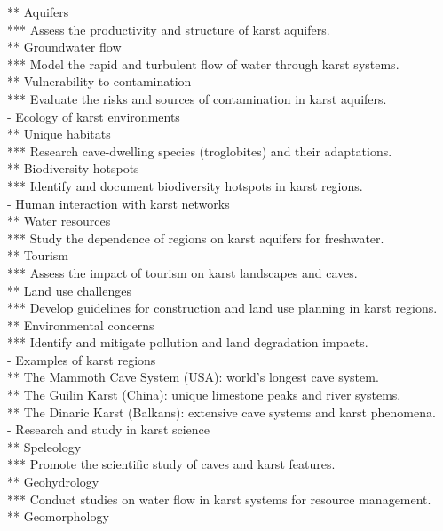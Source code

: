 ** Aquifers \\
*** Assess the productivity and structure of karst aquifers. \\
** Groundwater flow \\
*** Model the rapid and turbulent flow of water through karst systems. \\
** Vulnerability to contamination \\
*** Evaluate the risks and sources of contamination in karst aquifers. \\
- Ecology of karst environments \\
** Unique habitats \\
*** Research cave-dwelling species (troglobites) and their adaptations. \\
** Biodiversity hotspots \\
*** Identify and document biodiversity hotspots in karst regions. \\
- Human interaction with karst networks \\
** Water resources \\
*** Study the dependence of regions on karst aquifers for freshwater. \\
** Tourism \\
*** Assess the impact of tourism on karst landscapes and caves. \\
** Land use challenges \\
*** Develop guidelines for construction and land use planning in karst regions. \\
** Environmental concerns \\
*** Identify and mitigate pollution and land degradation impacts. \\
- Examples of karst regions \\
** The Mammoth Cave System (USA): world's longest cave system. \\
** The Guilin Karst (China): unique limestone peaks and river systems. \\
** The Dinaric Karst (Balkans): extensive cave systems and karst phenomena. \\
- Research and study in karst science \\
** Speleology \\
*** Promote the scientific study of caves and karst features. \\
** Geohydrology \\
*** Conduct studies on water flow in karst systems for resource management. \\
** Geomorphology \\
